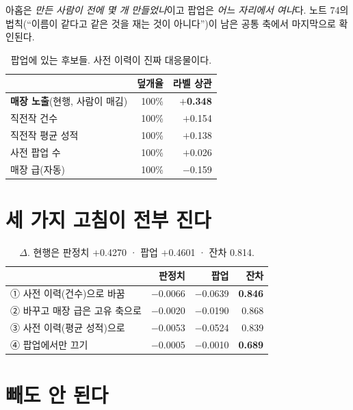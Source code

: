 \documentclass[10pt]{article}
\begin{document}
아홉은 \emph{만든 사람이 전에 몇 개 만들었나}이고 팝업은 \emph{어느 자리에서
여나}다. 노트 74의 법칙(``이름이 같다고 같은 것을 재는 것이 아니다'')이 남은
공통 축에서 마지막으로 확인된다.

\begin{table}[t]
\centering\tsize
\caption{팝업에 있는 후보들. 사전 이력이 진짜 대응물이다.}
\begin{tabular}{lrr}
\toprule
& 덮개율 & 라벨 상관 \\
\midrule
\textbf{매장 노출}(현행, 사람이 매김) & 100\% & \textbf{$+$0.348} \\
\midrule
직전작 건수 & 100\% & $+$0.154 \\
직전작 평균 성적 & 100\% & $+$0.138 \\
사전 팝업 수 & 100\% & $+$0.026 \\
매장 급(자동) & 100\% & $-$0.159 \\
\bottomrule
\end{tabular}
\end{table}

\section{세 가지 고침이 전부 진다}

\begin{table}[t]
\centering\tsize
\caption{$\Delta$. 현행은 판정치 $+$0.4270 · 팝업 $+$0.4601 · 잔차 0.814.}
\begin{tabular}{lrrr}
\toprule
& 판정치 & 팝업 & 잔차 \\
\midrule
① 사전 이력(건수)으로 바꿈 & $-$0.0066 & $-$0.0639 & \textbf{0.846} \\
② 바꾸고 매장 급은 고유 축으로 & $-$0.0020 & $-$0.0190 & 0.868 \\
③ 사전 이력(평균 성적)으로 & $-$0.0053 & $-$0.0524 & 0.839 \\
④ 팝업에서만 끄기 & $-$0.0005 & $-$0.0010 & \textbf{0.689} \\
\bottomrule
\end{tabular}
\end{table}


\section{빼도 안 된다}
\end{document}
